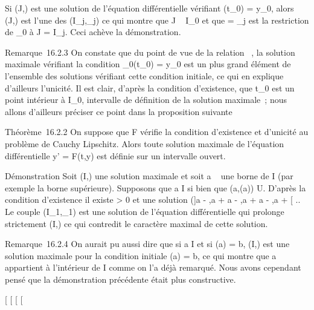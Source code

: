 \documentclass[]{article}
\begin{document}
Si (J,\psi) est une solution de l'équation différentielle vérifiant
\psi(t_0) = y_0, alors (J,\psi) est l'une des
(I_j,\psi_j) ce qui montre que J \subset~ I_0 et que \psi
= \psi_j est la restriction de \phi_0 à J = I_j.
Ceci achève la démonstration.

Remarque~16.2.3 On constate que du point de vue de la relation \prec~, la
solution maximale vérifiant la condition \phi_0(t_0) =
y_0 est un plus grand élément de l'ensemble des solutions
vérifiant cette condition initiale, ce qui en explique d'ailleurs
l'unicité. Il est clair, d'après la condition d'existence, que
t_0 est un point intérieur à I_0, intervalle de
définition de la solution maximale~; nous allons d'ailleurs préciser ce
point dans la proposition suivante

Théorème~16.2.2 On suppose que F vérifie la condition d'existence et
d'unicité au problème de Cauchy Lipschitz. Alors toute solution maximale
de l'équation différentielle y' = F(t,y) est définie sur un intervalle
ouvert.

Démonstration Soit (I,\phi) une solution maximale et soit a
\in\overline{}~ une borne de I (par exemple la borne
supérieure). Supposons que a \in I si bien que (a,\phi(a)) \in U. D'après la
condition d'existence il existe \eta > 0 et une solution (]a
- \eta,a + \eta[,\psi) vérifiant la condition initiale \psi(a) = \phi(a). D'après la
condition d'unicité, \phi et \psi qui coïncident au point a, coïncident
également sur l'intersection de leurs intervalles de définition, ce qui
permet de définir I_1 = I\cup]a - \eta,a + \eta[ et \phi_1 :
I_1 \rightarrow~ E par \phi_1(t) = \left
\ \cases \phi_0(t)&si t \in I
\cr \psi(t) &si t \in]a - \eta,a + \eta[ 
\right .. Le couple (I_1,\phi_1) est une
solution de l'équation différentielle qui prolonge strictement (I,\phi) ce
qui contredit le caractère maximal de cette solution.

Remarque~16.2.4 On aurait pu aussi dire que si a \in I et si \phi(a) = b,
(I,\phi) est une solution maximale pour la condition initiale \phi(a) = b, ce
qui montre que a appartient à l'intérieur de I comme on l'a déjà
remarqué. Nous avons cependant pensé que la démonstration précédente
était plus constructive.

[
[
[
[
\end{document}
